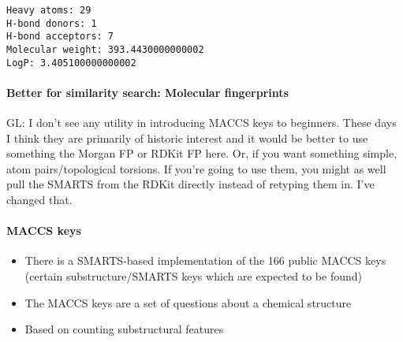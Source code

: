 \documentclass[11pt]{article}
\providecommand{\tightlist}{%
      \setlength{\itemsep}{0pt}\setlength{\parskip}{0pt}}
\begin{document}
    \begin{Verbatim}[commandchars=\\\{\}]
Heavy atoms: 29
H-bond donors: 1
H-bond acceptors: 7
Molecular weight: 393.4430000000002
LogP: 3.405100000000002
\end{Verbatim}

    \hypertarget{better-for-similarity-search-molecular-fingerprints}{%
\paragraph{Better for similarity search: Molecular
fingerprints}\label{better-for-similarity-search-molecular-fingerprints}}

GL: I don't see any utility in introducing MACCS keys to beginners.
These days I think they are primarily of historic interest and it would
be better to use something the Morgan FP or RDKit FP here. Or, if you
want something simple, atom pairs/topological torsions. If you're going
to use them, you might as well pull the SMARTS from the RDKit directly
instead of retyping them in. I've changed that.

\hypertarget{maccs-keys}{%
\paragraph{MACCS keys}\label{maccs-keys}}

\begin{itemize}
\tightlist
\item
  There is a SMARTS-based implementation of the 166 public MACCS keys
  (certain substructure/SMARTS keys which are expected to be found)
\item
  The MACCS keys are a set of questions about a chemical structure
\item
  Based on counting substructural features
\end{itemize}
\end{document}
